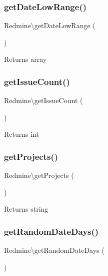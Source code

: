 \subsubsection{\texorpdfstring{get\+Date\+Low\+Range()}{getDateLowRange()}}
{\footnotesize\ttfamily Redmine\textbackslash{}get\+Date\+Low\+Range (\begin{DoxyParamCaption}{ }\end{DoxyParamCaption})}

\begin{DoxyReturn}{Returns}
array 
\end{DoxyReturn}
\mbox{\label{namespace_redmine_aefa4df1e77da1c4738d8758d9f3b4193}} 
\subsubsection{\texorpdfstring{get\+Issue\+Count()}{getIssueCount()}}
{\footnotesize\ttfamily Redmine\textbackslash{}get\+Issue\+Count (\begin{DoxyParamCaption}{ }\end{DoxyParamCaption})}

\begin{DoxyReturn}{Returns}
int 
\end{DoxyReturn}
\mbox{\label{namespace_redmine_a9be2d9a55b3df3a3b4f37a9b4878e813}} 
\subsubsection{\texorpdfstring{get\+Projects()}{getProjects()}}
{\footnotesize\ttfamily Redmine\textbackslash{}get\+Projects (\begin{DoxyParamCaption}{ }\end{DoxyParamCaption})}

\begin{DoxyReturn}{Returns}
string 
\end{DoxyReturn}
\mbox{\label{namespace_redmine_a64d7ae5ab4f6b01330e93a2eb33c7325}} 
\subsubsection{\texorpdfstring{get\+Random\+Date\+Days()}{getRandomDateDays()}}
{\footnotesize\ttfamily Redmine\textbackslash{}get\+Random\+Date\+Days (\begin{DoxyParamCaption}{ }\end{DoxyParamCaption})}

